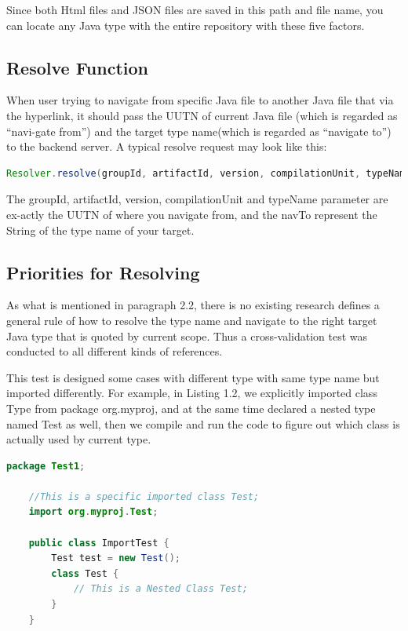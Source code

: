 \documentclass[runningheads]{llncs}
\begin{document}
Since both Html files and JSON files are saved in this path and file name, you can locate any Java type with the entire repository with these five factors.

\subsection{Resolve Function}
When user trying to navigate from specific Java file to another Java file that via the hyperlink, it should pass the UUTN of current Java file (which is regarded as “navi-gate from”) and the target type name(which is regarded as “navigate to”) to the backend server. A typical resolve request may look like this:

\begin{lstlisting}[language=Java, caption=Resolver example]
Resolver.resolve(groupId, artifactId, version, compilationUnit, typeName, navTo){/*...*/}
\end{lstlisting}

The groupId, artifactId, version, compilationUnit and typeName parameter are ex-actly the UUTN of where you navigate from, and the navTo represent the String of the type name of your target.

\subsection{Priorities for Resolving}

As what is mentioned in paragraph 2.2, there is no existing research defines a general rule of how to resolve the type name and navigate to the right target Java type that is quoted by current scope. Thus a cross-validation test was conducted to all different kinds of references.

This test is designed some cases with different type with same type name but imported differently. For example, in Listing 1.2, we explicitly imported class Type from package org.myproj, and at the same time declared a nested type named Test as well, then we compile and run the code to figure out which class is actually used by current type. 

\begin{lstlisting}[language=Java, caption=Sample code to show the complexity of Java]
	package Test1;

	//This is a specific imported class Test;
	import org.myproj.Test;
	
	public class ImportTest {
		Test test = new Test();
		class Test {
			// This is a Nested Class Test;
		}
	}
\end{lstlisting}
\end{document}
